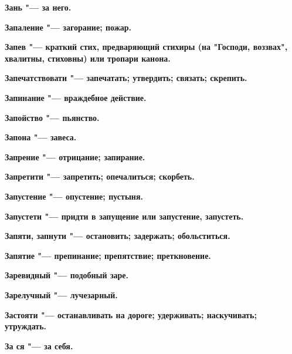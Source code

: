 \bfseries Зань \normalfont{} "--- за него. 




\bfseries Запаление \normalfont{} "--- загорание; пожар. 




\bfseries Запев \normalfont{} "--- краткий стих, предваряющий стихиры (на "Господи, воззвах", хвалитны, стиховны) или тропари канона. 




\bfseries Запечатствовати \normalfont{} "--- запечатать; утвердить; связать; скрепить. 




\bfseries Запинание \normalfont{} "--- враждебное действие. 




\bfseries Запойство \normalfont{} "--- пьянство. 




\bfseries Запона \normalfont{} "--- завеса. 




\bfseries Запрение \normalfont{} "--- отрицание; запирание. 




\bfseries Запретити \normalfont{} "--- запретить; опечалиться; скорбеть. 




\bfseries Запустение \normalfont{} "--- опустение; пустыня. 




\bfseries Запустети \normalfont{} "--- придти в запущение или запустение, запустеть. 




\bfseries Запяти, запнути \normalfont{} "--- остановить; задержать; обольститься. 




\bfseries Запятие \normalfont{} "--- препинание; препятствие; преткновение. 




\bfseries Заревидный \normalfont{} "--- подобный заре. 




\bfseries Зарелучный \normalfont{} "--- лучезарный. 




\bfseries Застояти \normalfont{} "--- останавливать на дороге; удерживать; наскучивать; утруждать. 




\bfseries За ся \normalfont{} "--- за себя. 




